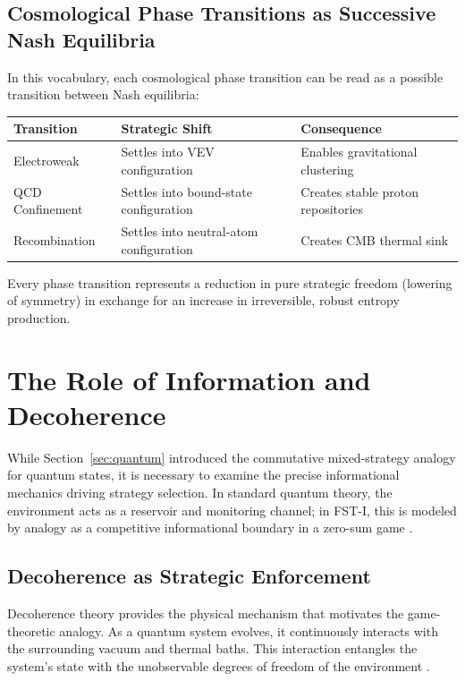 \documentclass[12pt,a4paper]{article}
\theoremstyle{remark}
\begin{document}
\subsection{Cosmological Phase Transitions as Successive Nash Equilibria}

In this vocabulary, each cosmological phase transition can be read as a possible transition between Nash equilibria:

\begin{center}
\begin{tabularx}{\textwidth}{@{}>{\raggedright\arraybackslash}p{3.1cm}YY@{}}
\toprule
\textbf{Transition} & \textbf{Strategic Shift} & \textbf{Consequence} \\
\midrule
Electroweak & Settles into VEV configuration & Enables gravitational clustering \\
QCD Confinement & Settles into bound-state configuration & Creates stable proton repositories \\
Recombination & Settles into neutral-atom configuration & Creates CMB thermal sink \\
\bottomrule
\end{tabularx}
\end{center}

Every phase transition represents a reduction in pure strategic freedom (lowering of symmetry) in exchange for an increase in irreversible, robust entropy production.

\section{The Role of Information and Decoherence}
\label{sec:decoherence}

While Section~\ref{sec:quantum} introduced the commutative mixed-strategy analogy for quantum states, it is necessary to examine the precise informational mechanics driving strategy selection. In standard quantum theory, the environment acts as a reservoir and monitoring channel; in FST-I, this is modeled by analogy as a competitive informational boundary in a zero-sum game \citep{Zurek2003}.

\subsection{Decoherence as Strategic Enforcement}

Decoherence theory provides the physical mechanism that motivates the game-theoretic analogy. As a quantum system evolves, it continuously interacts with the surrounding vacuum and thermal baths. This interaction entangles the system's state with the unobservable degrees of freedom of the environment \citep{MeasurementClassical}.
\end{document}
